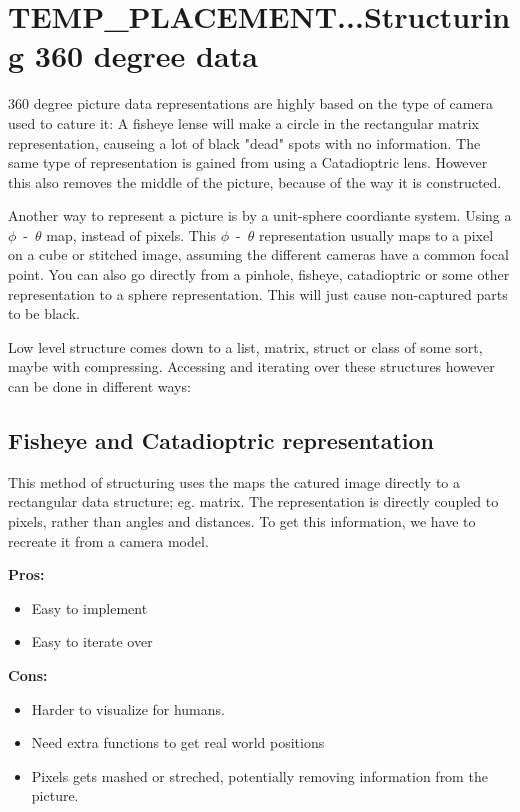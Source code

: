 
\section{TEMP\_PLACEMENT...Structuring 360 degree data}
360 degree picture data representations are highly based on the type of camera used to cature it: A fisheye lense will make a circle in the rectangular matrix representation, causeing a lot of black "dead" spots with no information. The same type of representation is gained from using a Catadioptric lens. However this also removes the middle of the picture, because of the way it is constructed.

Another way to represent a picture is by a unit-sphere coordiante system. Using a $\phi$~-~$\theta$ map, instead of pixels. This $\phi$~-~$\theta$ representation usually maps to a pixel on a cube or stitched image, assuming the different cameras have a common focal point. You can also go directly from a pinhole, fisheye, catadioptric or some other representation to a sphere representation. This will just cause non-captured parts to be black.

Low level structure comes down to a list, matrix, struct or class of some sort, maybe with compressing. Accessing and iterating over these structures however can be done in different ways: 

\subsection{Fisheye and Catadioptric representation}
This method of structuring uses the maps the catured image directly to a rectangular data structure; eg. matrix. The representation is directly coupled to pixels, rather than angles and distances. To get this information, we have to recreate it from a camera model.

\textbf{Pros:}
\begin{itemize}
    \item Easy to implement
    \item Easy to iterate over
\end{itemize}

\textbf{Cons:}
\begin{itemize}
    \item Harder to visualize for humans. 
    \item Need extra functions to get real world positions
    \item Pixels gets mashed or streched, potentially removing information from the picture.
\end{itemize}

